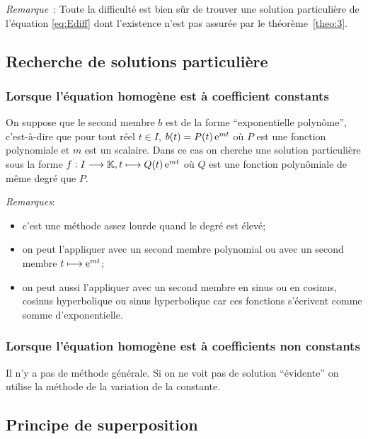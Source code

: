 \emph{Remarque}~: Toute la difficulté est bien sûr de trouver une solution 
particulière de l'équation \eqref{eq:Ediff} dont l'existence n'est pas assurée 
par le théorème~\ref{theo:3}.

\subsection{Recherche de solutions particulière}
\label{subsec:recherchesolutionpart}

\subsubsection{Lorsque l'équation homogène est à coefficient constants}
\label{subsubsec:recherchesolutionpart-coefconstants}

On suppose que le second membre \(b\) est de la forme ``exponentielle 
polynôme'', c'est-à-dire que pour tout réel \(t \in I\), \(b(t) = P(t) \operatorname{e}^{mt}\) 
où \(P\) est une fonction polynomiale et \(m\) est un scalaire. Dans ce cas on 
cherche une solution particulière sous la forme 
\(f:I \longrightarrow \mathbb{K}, t \longmapsto Q(t)\operatorname{e}^{mt}\) où \(Q\) est une fonction polynômiale 
de même degré que \(P\).

\emph{Remarques}:
\begin{itemize}
  \item c'est une méthode assez lourde quand le degré est élevé;
  \item on peut l'appliquer avec un second membre polynomial ou avec un second 
    membre \(t \longmapsto \operatorname{e}^{mt}\);
  \item on peut aussi l'appliquer avec un second membre en sinus ou en 
    cosinus, cosinus hyperbolique ou sinus hyperbolique car ces fonctions 
    s'écrivent comme somme d'exponentielle.
\end{itemize}

\subsubsection{Lorsque l'équation homogène est à coefficients non constants}
\label{subsubsec:recherchesolutionpart-coefnnconstants}

Il n'y a pas de méthode générale. Si on ne voit pas de solution ``évidente'' on 
utilise la méthode de la variation de la constante.

\subsection{Principe de superposition}
\label{subsec:principesuperposition}

